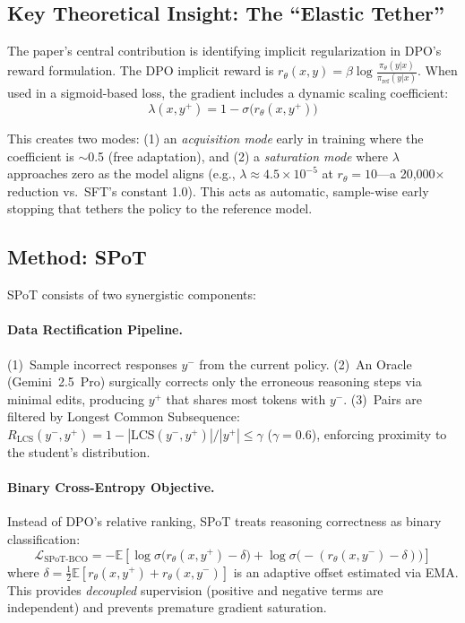 \documentclass[11pt]{article}
\begin{document}
\subsection{Key Theoretical Insight: The ``Elastic Tether''}

The paper's central contribution is identifying implicit regularization in DPO's reward formulation. The DPO implicit reward is $r_\theta(x,y) = \beta \log \frac{\pi_\theta(y|x)}{\pi_{\text{ref}}(y|x)}$. When used in a sigmoid-based loss, the gradient includes a dynamic scaling coefficient:
\begin{equation}
    \lambda(x, y^+) = 1 - \sigma\bigl(r_\theta(x, y^+)\bigr)
\end{equation}

This creates two modes: (1) an \emph{acquisition mode} early in training where the coefficient is $\sim$0.5 (free adaptation), and (2) a \emph{saturation mode} where $\lambda$ approaches zero as the model aligns (e.g., $\lambda \approx 4.5 \times 10^{-5}$ at $r_\theta = 10$---a 20,000$\times$ reduction vs.\ SFT's constant 1.0). This acts as automatic, sample-wise early stopping that tethers the policy to the reference model.

\subsection{Method: SPoT}

SPoT consists of two synergistic components:

\paragraph{Data Rectification Pipeline.} (1)~Sample incorrect responses $y^-$ from the current policy. (2)~An Oracle (Gemini~2.5~Pro) surgically corrects only the erroneous reasoning steps via minimal edits, producing $y^+$ that shares most tokens with $y^-$. (3)~Pairs are filtered by Longest Common Subsequence: $R_{\text{LCS}}(y^-, y^+) = 1 - |{\text{LCS}(y^-, y^+)}|/{|y^+|} \leq \gamma$ ($\gamma{=}0.6$), enforcing proximity to the student's distribution.

\paragraph{Binary Cross-Entropy Objective.} Instead of DPO's relative ranking, SPoT treats reasoning correctness as binary classification:
\begin{equation}
    \mathcal{L}_{\text{SPoT-BCO}} = -\mathbb{E}\!\left[\log \sigma\!\bigl(r_\theta(x,y^+) - \delta\bigr) + \log \sigma\!\bigl(-(r_\theta(x,y^-) - \delta)\bigr)\right]
\end{equation}
where $\delta = \frac{1}{2}\mathbb{E}[r_\theta(x,y^+) + r_\theta(x,y^-)]$ is an adaptive offset estimated via EMA. This provides \emph{decoupled} supervision (positive and negative terms are independent) and prevents premature gradient saturation.
\end{document}
